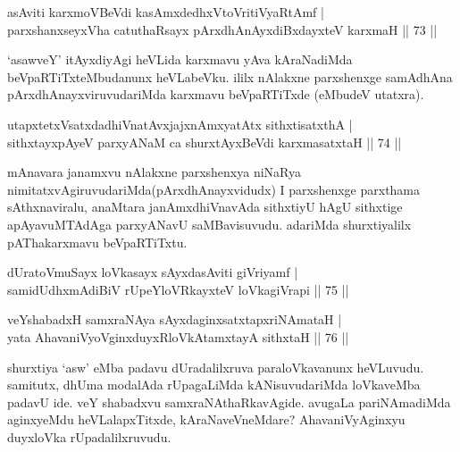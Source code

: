 
\begin{shl}
asAviti karxmoV\s BeVdi kasAmxdedhxVtoVritiVyaRtAmf | \\
parxshanxseyxVha catuthaRsayx pArxdhAnAyxdiBxdayxteV karxmaH \hfill|| 73 || 
\end{shl}

\begin{artha}
`asawveY' itAyxdiyAgi heVLida karxmavu yAva kAraNadiMda beVpaRTiTxteMbudanunx heVLabeVku. ililx nAlakxne parxshenxge samAdhAna pArxdhAnayxviruvudariMda karxmavu beVpaRTiTxde (eMbudeV utatxra).
\end{artha}


\begin{shl}
utapxtetxVsatxdadhiVnatAvxjajxnAmxyatAtx sithxtisatxthA | \\
sithxtayxpAyeV parxyANaM ca shurxtAyx\s BeVdi karxmasatxtaH \hfill|| 74 || 
\end{shl}

\begin{artha}
mAnavara janamxvu nAlakxne parxshenxya niNaRya nimitatxvAgiruvudariMda\break (pArxdhAnayxvidudx) I parxshenxge parxthama sAthxnaviralu, anaMtara janAmxdhiVnavAda sithxtiyU hAgU sithxtige apAyavuMTAdAga parxyANavU saMBavisuvudu. adariMda shurxtiyalilx pAThakarxmavu beVpaRTiTxtu.
\end{artha}


\begin{shl}
dUratoV\s muSayx loVkasayx sAyxdasAviti giVriyamf | \\
samidUdhxmAdiBiV rUpeYloVRkayxteV loVkagiVrapi \hfill|| 75 || 
\end{shl}

\begin{shl}
veYshabadxH samxraNAya sAyxdaginxsatxtapxriNAmataH | \\
yata AhavaniVyoV\s ginxduyxRloVkAtamxtayA sithxtaH \hfill|| 76 || 
\end{shl}

\begin{artha}
shurxtiya `asw' eMba padavu dUradalilxruva paraloVkavanunx heVLuvudu. 
samitutx, dhUma modalAda rUpagaLiMda kANisuvudariMda loVkaveMba padavU 
ide. veY shabadxvu samxraNAthaRkavAgide. avugaLa pariNAmadiMda 
aginxyeMdu heVLalapxTitxde, kAraNaveVneMdare? AhavaniVyAginxyu 
duyxloVka rUpadalilxruvudu.
\end{artha}

